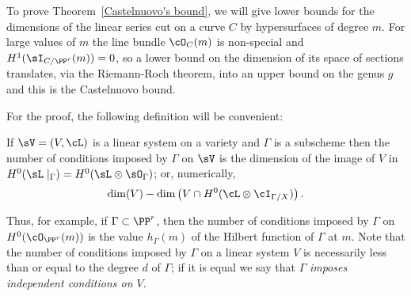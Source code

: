 To prove Theorem~\ref{Castelnuovo's bound}, we will give lower bounds for the dimensions of the linear series  cut on a curve $C$ by hypersurfaces of degree $m$. For large values of $m$ the line bundle $\cO_C(m)$ is non-special and $H^1(\sI_{C/\PP^r}(m)) = 0$, so a lower bound on the dimension of its space of sections translates, via the Riemann-Roch theorem, into an upper bound on the genus $g$ and this is the Castelnuovo bound.

For the proof, the following definition will be convenient:

\begin{definition}
If $\sV = (V,\cL)$ is a linear system on a variety and $\Gamma$ is a subscheme then the number of conditions
imposed by $\Gamma$ on $\sV$ is the dimension of the image of $V$ in $H^0(\sL\mid_\Gamma) = H^0(\sL \otimes \sO_\Gamma)$; or, numerically,
$$
\dim(V) - \dim \left(V \cap H^0(\cL\otimes \cI_{\Gamma/X}) \right).
$$\end{definition}

Thus, for example, if $\Gamma \subset \PP^r$, then the number of conditions imposed by $\Gamma$ on $H^0(\cO_{\PP^r}(m))$ is the value $h_\Gamma(m)$ of the Hilbert function of $\Gamma$ at $m$.
Note that the number of conditions imposed by $\Gamma$ on a linear system $V$ is necessarily less than or equal to the degree $d$ of $\Gamma$; if it is equal we say that $\Gamma$ \emph{imposes independent conditions on $V$}.

